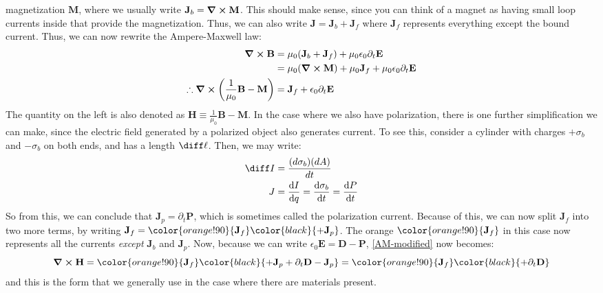 magnetization \( \mathbf{M} \), where we usually write \( \mathbf{J}_b = \curl \mathbf{M} \). This should
make sense, since you can think of a magnet as having small loop currents inside that provide the
magnetization. Thus, we can also write \( \mathbf{J} = \mathbf{J}_b + \mathbf{J}_f \) where \( \mathbf{J}_f
\) represents everything except the bound current. Thus, we can now rewrite the Ampere-Maxwell law:
\begin{align}
	\curl \mathbf{B} &= \mu_0(\mathbf{J}_b + \mathbf{J}_f) + \mu_0 \epsilon_0 \partial_t \mathbf{E} \\
	&= \mu_0(\curl \mathbf{M}) + \mu_0 \mathbf{J}_f + \mu_0 \epsilon_0 \partial_t \mathbf{E} \\ 
	\label{AM-modified}
	\therefore \curl\left( \frac{1}{\mu_0}\mathbf{B} - \mathbf{M} \right) &=  \mathbf{J}_f + \epsilon_0
	\partial_t \mathbf{E} 
\end{align}
The quantity on the left is also denoted as \( \mathbf{H} \equiv \frac{1}{\mu_0}\mathbf{B} - \mathbf{M} \).
In the case where we also have polarization, there is one further simplification we can make, since the
electric field generated by a polarized object also generates current. To see this, consider a cylinder with
charges \( +\sigma_b \) and \( -\sigma_b \) on both ends, and has a length \( \diff \ell \). Then, we may
write:
\begin{align*}
	\diff I &= \frac{(d\sigma_b)(dA)}{dt}\\
	J &= \dv{I}{q} = \dv{\sigma_b}{t} = \dv{P}{t}
\end{align*}
So from this, we can conclude that \( \mathbf{J}_p = \partial_t \mathbf{P} \), which is sometimes called the
polarization current. Because of this, we can now split \( \mathbf{J}_f \) into two more terms, by writing \(
\mathbf{J}_f = \color{orange!90}{\mathbf{J}_f} \color{black}{+ \mathbf{J}_p}\). The orange \(
\color{orange!90}{\mathbf{J}_f} \) in this case now represents all the currents 
\textit{except} \( \mathbf{J}_b \) and \( \mathbf{J}_p \). Now, because we can write \( \epsilon_0 \mathbf{E}
= \mathbf{D} - \mathbf{P}\), \ref{AM-modified} now becomes:
\[
	\curl \mathbf{H} = \color{orange!90}{\mathbf{J}_f}\color{black}{+ \mathbf{J}_p + \partial_t \mathbf{D} -
	\mathbf{J}_p} = \color{orange!90}{\mathbf{J}_f} \color{black}{ + \partial_t \mathbf{D}}
\]
and this is the form that we generally use in the case where there are materials present.  

